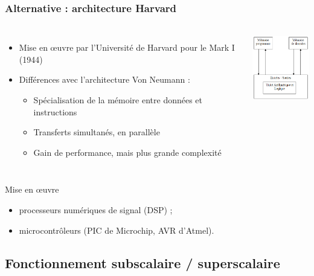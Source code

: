 \begin{frame}
\frametitle{Alternative : architecture Harvard \cite{wp-harvard}}
\begin{columns}
  \begin{itemize}
  \item Mise en œuvre par l'Université de Harvard pour le Mark I (1944)
  \item Différences avec l'architecture Von Neumann :
  \begin{itemize}
  \item Spécialisation de la mémoire entre données et instructions
  \item Transferts simultanés, en parallèle
  \item Gain de performance, mais plus grande complexité
  \end{itemize}
  \end{itemize}
  \includegraphics[height=3cm]{../illustration/Architecture_Harvard.png}
\end{columns}

\begin{exampleblock}{Mise en œuvre}
\begin{itemize}
\item processeurs numériques de signal (DSP) ;
\item microcontrôleurs (PIC de Microchip, AVR d'Atmel).
\end{itemize}
\end{exampleblock}

\end{frame}


\subsection{Fonctionnement subscalaire / superscalaire}

